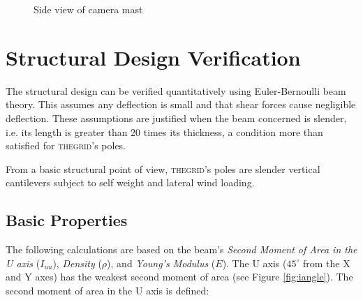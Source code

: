 \documentclass[12pt]{article} %
\newcommand{\thegrid}{\textsc{the\textperiodcentered grid}\xspace}
\begin{document}
\begin{appendices}
\begin{figure}[h]
      \caption{Side view of camera mast}
  \end{figure}

\clearpage
\section{Structural Design Verification}
The structural design can be verified quantitatively using Euler-Bernoulli beam
theory.  This assumes any deflection is small and that shear forces cause
negligible deflection.  These assumptions are justified when the beam concerned
is slender, i.e. its length is greater than 20 times its thickness, a condition
more than satisfied for \thegrid's poles.

From a basic structural point of view, \thegrid's poles are slender vertical
cantilevers subject to self weight and lateral wind loading.

\subsection{Basic Properties}
The following calculations are based on the beam's \emph{Second Moment of Area
in the U axis} ($I_{uu}$), \emph{Density} ($\rho$), and \emph{Young's Modulus}
($E$).  The U axis ($45^\circ$ from the X and Y axes) has the weakest second
moment of area (see Figure \ref{fig:iangle}).  The second moment of area in the
U axis is defined:


\end{appendices}
\end{document}
